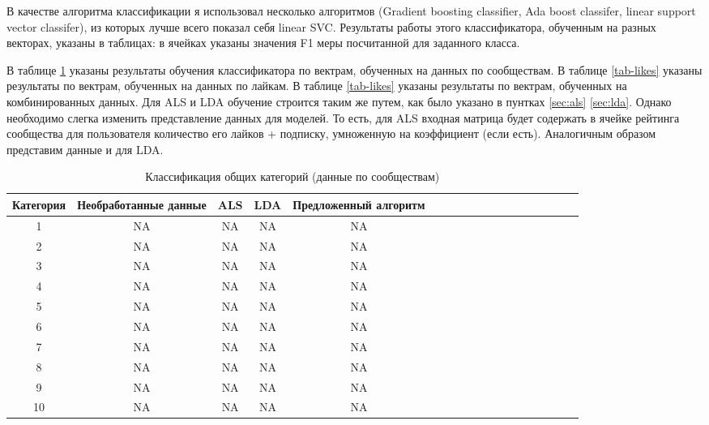 \documentclass[times,specification,annotation]{itmo-student-thesis}
\begin{document}
В качестве алгоритма классификации я использовал несколько алгоритмов (Gradient boosting classifier, Ada boost classifer, linear support vector classifer), из которых лучше всего показал себя linear SVC. Результаты работы этого классификатора, обученным на разных векторах, указаны в таблицах: в ячейках указаны значения F1 меры посчитанной для заданного класса. 

В таблице \ref{tab-subs} указаны результаты обучения классификатора по вектрам, обученных на данных по сообществам. В таблице \ref{tab-likes} указаны результаты по вектрам, обученных на данных по лайкам. В таблице \ref{tab-likes} указаны результаты по вектрам, обученных на комбинированных данных. Для ALS и LDA обучение строится таким же путем, как было указано в пунтках \ref{sec:als} \ref{sec:lda}. Однако необходимо слегка изменить представление данных для моделей. То есть, для ALS входная матрица будет содержать в ячейке рейтинга сообщества для пользователя количество его лайков + подписку, умноженную на коэффициент (если есть). Аналогичным образом представим данные и для LDA.  

\begin{table}[!h]
\caption{Классификация общих категорий (данные по сообществам)}\label{tab-subs}
\centering
\begin{tabular}{|*{18}{c|}}\hline
Категория & Необработанные данные & ALS & LDA & Предложенный алгоритм \\\hline
1  & NA & NA & NA & NA  \\\hline
2  & NA & NA & NA & NA \\\hline
3  & NA & NA & NA & NA \\\hline
4  & NA & NA & NA & NA \\\hline
5  & NA & NA & NA & NA  \\\hline
6  & NA & NA & NA & NA \\\hline
7  & NA & NA & NA & NA \\\hline
8  & NA & NA & NA & NA \\\hline
9  & NA & NA & NA & NA  \\\hline
10  & NA & NA & NA & NA \\\hline
\end{tabular}
\end{table}
\end{document}
